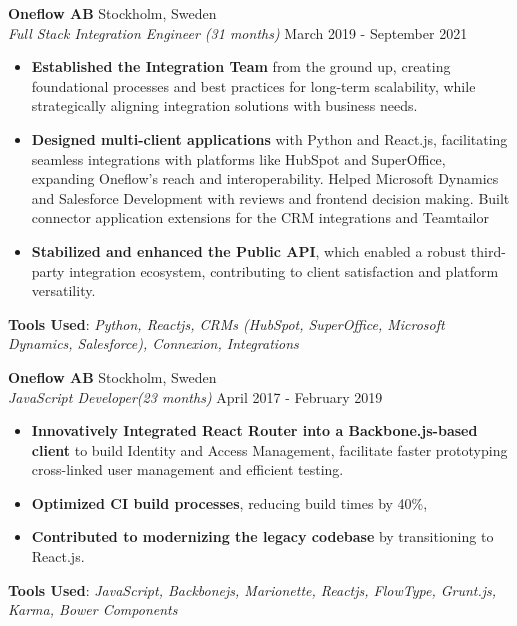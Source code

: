 \begin{minipage}[t]{0.61\textwidth}
\raggedright
\setlength{\parskip}{1ex}%

\vspace{1ex}

\Large
{}
\vspace{0.5em}
\Large
\noindent
\textbf{Oneflow AB} \hfill Stockholm, Sweden\\
\textit{Full Stack Integration Engineer (31 months)} \hfill March 2019 - September 2021
\begin{itemize}
\setlength{\itemsep}{0.5em}
    \item \textbf{Established the Integration Team} from the ground up, creating foundational processes and best practices for long-term scalability, while strategically aligning integration solutions with business needs.
    \item \textbf{Designed multi-client applications} with Python and React.js, facilitating seamless integrations with platforms like HubSpot and SuperOffice, expanding Oneflow’s reach and interoperability.
    Helped Microsoft Dynamics and Salesforce Development with reviews and frontend decision making.
    Built connector application extensions for the CRM integrations and Teamtailor
    \item \textbf{Stabilized and enhanced the Public API}, which enabled a robust third-party integration ecosystem, contributing to client satisfaction and platform versatility.
\end{itemize}
\vspace{0.2em}
\textbf{Tools Used}: \textit{Python, Reactjs, CRMs (HubSpot, SuperOffice, Microsoft Dynamics, Salesforce), Connexion, Integrations}

\vspace{1em}

\noindent
\textbf{Oneflow AB} \hfill Stockholm, Sweden\\
\textit{JavaScript Developer(23 months)} \hfill April 2017 - February 2019
\begin{itemize}
\setlength{\itemsep}{0.5em}
    \item \textbf{Innovatively Integrated React Router into a Backbone.js-based client} to build Identity and Access Management, facilitate faster prototyping cross-linked user management and efficient testing.
    \item \textbf{Optimized CI build processes}, reducing build times by 40\%,
    \item \textbf{Contributed to modernizing the legacy codebase} by transitioning to React.js.
\end{itemize}
\vspace{0.2em}
\textbf{ Tools Used}: \textit{JavaScript, Backbonejs, Marionette, Reactjs, FlowType, Grunt.js, Karma, Bower Components}


\end{minipage}
